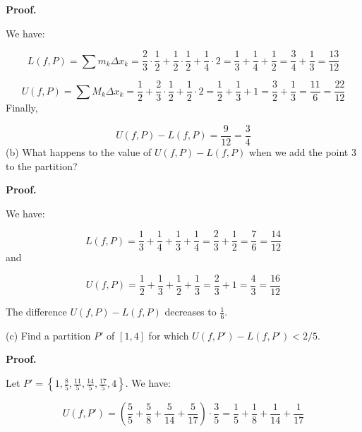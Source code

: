 \documentclass[10pt]{article}
\begin{document}
\textbf{Proof.}



We have:


\begin{equation*}
L( f,P) =\sum m_{k} \Delta x_{k} =\frac{2}{3} \cdotp \frac{1}{2} +\frac{1}{2} \cdotp \frac{1}{2} +\frac{1}{4} \cdotp 2=\frac{1}{3} +\frac{1}{4} +\frac{1}{2} =\frac{3}{4} +\frac{1}{3} =\frac{13}{12}
\end{equation*}

\begin{equation*}
U( f,P) =\sum M_{k} \Delta x_{k} =\frac{1}{2} +\frac{2}{3} \cdot \frac{1}{2} +\frac{1}{2} \cdotp 2=\frac{1}{2} +\frac{1}{3} +1=\frac{3}{2} +\frac{1}{3} =\frac{11}{6} =\frac{22}{12}
\end{equation*}
Finally,


\begin{equation*}
U( f,P) -L( f,P) =\frac{9}{12} =\frac{3}{4}
\end{equation*}
(b) What happens to the value of $\displaystyle U( f,P) -L( f,P)$ when we add the point $\displaystyle 3$ to the partition?



\textbf{Proof.}



We have:


\begin{equation*}
L( f,P) =\frac{1}{3} +\frac{1}{4} +\frac{1}{3} +\frac{1}{4} =\frac{2}{3} +\frac{1}{2} =\frac{7}{6} =\frac{14}{12}
\end{equation*}
and


\begin{equation*}
U( f,P) =\frac{1}{2} +\frac{1}{3} +\frac{1}{2} +\frac{1}{3} =\frac{2}{3} +1=\frac{4}{3} =\frac{16}{12}
\end{equation*}


The difference $\displaystyle U( f,P) -L( f,P)$ decreases to $\displaystyle \frac{1}{6}$.



(c) Find a partition $\displaystyle P'$ of $\displaystyle [ 1,4]$ for which $\displaystyle U( f,P') -L( f,P') < 2/5$. 



\textbf{Proof.}



Let $\displaystyle P'=\left\{1,\frac{8}{5} ,\frac{11}{5} ,\frac{14}{5} ,\frac{17}{5} ,4\right\}$. We have:




\begin{equation*}
U( f,P') =\left(\frac{5}{5} +\frac{5}{8} +\frac{5}{14} +\frac{5}{17}\right) \cdotp \frac{3}{5} =\frac{1}{5} +\frac{1}{8} +\frac{1}{14} +\frac{1}{17}
\end{equation*}
 
\end{document}
